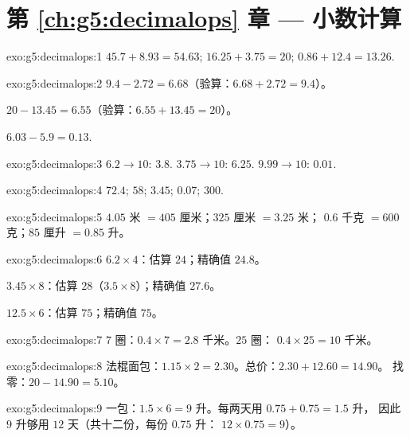 \section*{第 \ref{ch:g5:decimalops} 章 --- 小数计算}

\begin{solution}{exo:g5:decimalops:1}
$45.7 + 8.93 = 54.63$; \quad
$16.25 + 3.75 = 20$; \quad
$0.86 + 12.4 = 13.26$.
\end{solution}

\begin{solution}{exo:g5:decimalops:2}
$9.4 - 2.72 = 6.68$（验算：$6.68 + 2.72 = 9.4$）。

$20 - 13.45 = 6.55$（验算：$6.55 + 13.45 = 20$）。

$6.03 - 5.9 = 0.13$.
\end{solution}

\begin{solution}{exo:g5:decimalops:3}
$6.2 \to 10$: $3.8$. \quad $3.75 \to 10$: $6.25$. \quad
$9.99 \to 10$: $0.01$.
\end{solution}

\begin{solution}{exo:g5:decimalops:4}
$72.4$; \quad $58$; \quad $3.45$; \quad $0.07$; \quad $300$.
\end{solution}

\begin{solution}{exo:g5:decimalops:5}
$4.05$ 米 $= 405$ 厘米；\quad $325$ 厘米 $= 3.25$ 米；\quad
$0.6$ 千克 $= 600$ 克；\quad $85$ 厘升 $= 0.85$ 升。
\end{solution}

\begin{solution}{exo:g5:decimalops:6}
$6.2 \times 4$：估算 $24$；精确值 $24.8$。

$3.45 \times 8$：估算 $28$（$3.5 \times 8$）；精确值 $27.6$。

$12.5 \times 6$：估算 $75$；精确值 $75$。
\end{solution}

\begin{solution}{exo:g5:decimalops:7}
$7$ 圈：$0.4 \times 7 = 2.8$ 千米。$25$ 圈：
$0.4 \times 25 = 10$ 千米。
\end{solution}

\begin{solution}{exo:g5:decimalops:8}
法棍面包：$1.15 \times 2 = 2.30$。总价：$2.30 + 12.60 = 14.90$。
找零：$20 - 14.90 = 5.10$。
\end{solution}

\begin{solution}{exo:g5:decimalops:9}
一包：$1.5 \times 6 = 9$ 升。每两天用 $0.75 + 0.75 = 1.5$ 升，
因此 $9$ 升够用 $12$ 天（共十二份，每份 $0.75$ 升：
$12 \times 0.75 = 9$）。
\end{solution}

